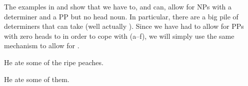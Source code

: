 \documentclass[11pt,a4paper]{article}
\begin{document}
\newpage
The examples in  and  show that we have
to, and can, allow
for NPs with a determiner and a PP but no head noun. In particular, there are a big pile of determiners that can take  (well actually ). Since we have had to
allow for PPs with zero heads to in order to cope with
(a--f), we will simply use the same mechanism to
allow for . 

\begin{examples}
\item \label{OFZERO}
\begin{examples}
\item
He ate some of the ripe peaches. 
\item
He ate some of them.
\end{examples}
\end{examples}
\end{document}
